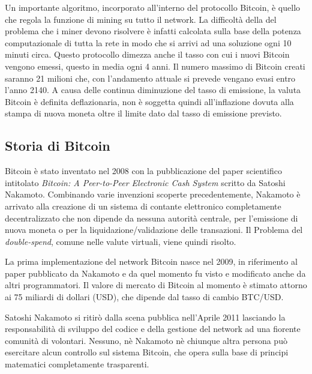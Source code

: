Un importante algoritmo, incorporato all'interno del protocollo Bitcoin, è quello che regola la funzione di mining su tutto il network. La difficoltà della del problema che i miner devono risolvere è infatti calcolata sulla base della potenza computazionale di tutta la rete in modo che si arrivi ad una soluzione ogni 10 minuti circa. Questo protocollo dimezza anche il tasso con cui i nuovi Bitcoin vengono emessi, questo in media ogni 4 anni. Il numero massimo di Bitcoin creati saranno 21 milioni che, con l'andamento attuale si prevede vengano evasi entro l'anno 2140. A causa delle continua diminuzione del tasso di emissione, la valuta Bitcoin è definita deflazionaria, non è soggetta quindi all'inflazione dovuta alla stampa di nuova moneta oltre il limite dato dal tasso di emissione previsto.

\subsection{Storia di Bitcoin}
Bitcoin è stato inventato nel 2008 con la pubblicazione del paper scientifico intitolato \textit{Bitcoin: A Peer-to-Peer Electronic Cash System} \cite{paper-bitcoin:satoshi} scritto da Satoshi Nakamoto. Combinando varie invenzioni scoperte precedentemente, Nakamoto è arrivato alla creazione di un sistema di contante elettronico completamente decentralizzato che non dipende da nessuna autorità centrale, per l'emissione di nuova moneta o per la liquidazione/validazione delle transazioni. Il Problema del \textit{double-spend}, comune nelle valute virtuali, viene quindi risolto. 

La prima implementazione del network Bitcoin nasce nel 2009, in riferimento al paper pubblicato da Nakamoto \cite{paper-bitcoin:satoshi} e da quel momento fu visto e modificato anche da altri programmatori. Il valore di mercato di Bitcoin al momento è stimato attorno ai 75 miliardi di dollari (USD), che dipende dal tasso di cambio BTC/USD.

Satoshi Nakamoto si ritirò dalla scena pubblica nell'Aprile 2011 lasciando la responsabilità di sviluppo del codice e della gestione del network ad una fiorente comunità di volontari. Nessuno, nè Nakamoto nè chiunque altra persona può esercitare alcun controllo sul sistema Bitcoin, che opera sulla base di principi matematici completamente trasparenti.

